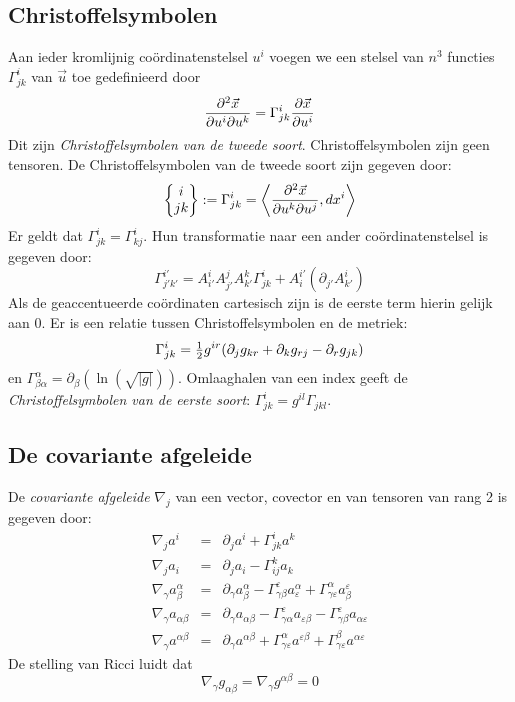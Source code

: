 \documentclass[twoside]{report}
\begin{document}
\subsection{Christoffelsymbolen}
Aan ieder kromlijnig co\"ordinatenstelsel $u^i$ voegen we een stelsel van $n^3$
functies $\Gamma^i_{jk}$ van $\vec{u}$ toe gedefinieerd door
\[
\frac{\partial^2\vec{x}}{\partial u^i\partial u^k}=\Gamma_{jk}^i\frac{\partial \vec{x}}{\partial u^i}
\]
Dit zijn {\it Christoffelsymbolen van de tweede soort}. Christoffelsymbolen
zijn geen tensoren. De Christoffelsymbolen van de tweede soort zijn gegeven
door:
\[
\left\{\begin{array}{@{}c@{}}i\\ jk \end{array}\right\}:=\Gamma^i_{jk}=
\left\langle\frac{\partial^2\vec{x}}{\partial u^k\partial u^j},dx^i\right\rangle
\]
Er geldt dat $\Gamma^i_{jk}=\Gamma^i_{kj}$. Hun transformatie naar een ander
co\"ordinatenstelsel is gegeven door:
\[
\Gamma_{j'k'}^{i'}=A_{i'}^iA_{j'}^jA_{k'}^k\Gamma^i_{jk}+A_i^{i'}(\partial_{j'}A_{k'}^i)
\]
Als de geaccentueerde co\"ordinaten cartesisch zijn is de eerste term hierin
gelijk aan 0.
\npar
Er is een relatie tussen Christoffelsymbolen en de metriek:
\[
\Gamma_{jk}^i=\mbox{$\frac{1}{2}$} g^{ir}(\partial_j g_{kr}+\partial_k g_{rj}-\partial_r g_{jk})
\]
en $\Gamma^\alpha_{\beta\alpha}=\partial_\beta(\ln(\sqrt{|g|}))$.
\npar
Omlaaghalen van een index geeft de {\it Christoffelsymbolen van de eerste soort}:
$\Gamma^i_{jk}=g^{il}\Gamma_{jkl}$.

\subsection{De covariante afgeleide}
De {\it covariante afgeleide} $\nabla_j$ van een vector, covector en van
tensoren van rang 2 is gegeven door:
\begin{eqnarray*}
\nabla_ja^i                  &=&\partial_ja^i+\Gamma^i_{jk}a^k\\
\nabla_ja_i                  &=&\partial_ja_i-\Gamma^k_{ij}a_k\\
\nabla_\gamma a^\alpha_\beta &=&\partial_\gamma a^\alpha_\beta -\Gamma^\varepsilon_{\gamma\beta} a^\alpha_\varepsilon+\Gamma^\alpha_{\gamma\varepsilon}a_\beta^\varepsilon\\
\nabla_\gamma a_{\alpha\beta}&=&\partial_\gamma a_{\alpha\beta}-\Gamma^\varepsilon_{\gamma\alpha}a_{\varepsilon\beta}-\Gamma^\varepsilon_{\gamma\beta}a_{\alpha\varepsilon}\\
\nabla_\gamma a^{\alpha\beta}&=&\partial_\gamma a^{\alpha\beta}+\Gamma^\alpha_{\gamma\varepsilon}a^{\varepsilon\beta}+\Gamma^\beta_{\gamma\varepsilon}a^{\alpha\varepsilon}
\end{eqnarray*}
De stelling van Ricci luidt dat
\[
\nabla_\gamma g_{\alpha\beta}=\nabla_\gamma g^{\alpha\beta}=0
\]
\end{document}
